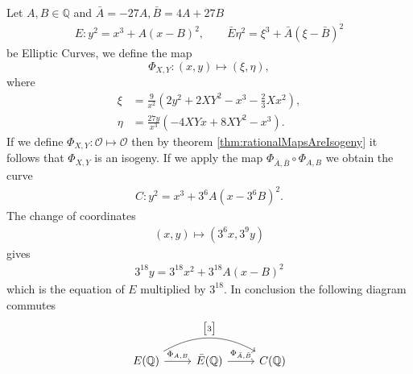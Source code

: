 \begin{example} \label{eq:dualIsogenies}
  Let $A, B \in \mathbb{Q}$ and $\bar{A} = -27A, \bar{B} = 4A + 27B$
  \begin{align*}
    E: y^2 = x^3 + A(x - B)^2, \qquad \bar{E} \eta^2 = \xi^3 + \bar{A} (\xi - \bar{B})^2
  \end{align*}
  be Elliptic Curves, we define the map
  \[ \Phi_{X, Y}: (x, y) \mapsto (\xi, \eta), \]
  where
  \begin{align*}
    \xi &=  \frac{9}{x^2} \left( 2y^2 + 2XY^2 - x^3 - \frac{2}{3} X x^2  \right), \\
    \eta &= \frac{27y}{x^3} \left( -4XYx + 8XY^2 - x^3 \right).
  \end{align*}
  If we define $\Phi_{X, Y}: \mathcal{O} \mapsto \mathcal{O}$ then by
  theorem \ref{thm:rationalMapsAreIsogeny} it follows
  that $\Phi_{X, Y}$ is an isogeny.
  If we apply the map $\Phi_{\bar{A}, \bar{B}} \circ \Phi_{A, B}$
  we obtain the curve
  \begin{align*}
    C: y^2 = x^3 + 3^{6}A(x - 3^6 B)^2.
  \end{align*}
  The change of coordinates
  \begin{align*}
    (x, y) \mapsto (3^6 x, 3^9 y)
  \end{align*}
  gives
  \begin{align*}
    3^{18}y = 3^{18}x^2 + 3^{18}A(x - B)^2
  \end{align*}
  which is the equation of $E$ multiplied by $3^{18}$.
  In conclusion the following diagram commutes
  \begin{equation*}
  \begin{tikzcd}
    E(\mathbb{Q}) \ar[rr, bend left, "\begin{bmatrix}3\end{bmatrix}"] \ar[r, "\Phi_{A, B}"] & \bar{E}(\mathbb{Q}) \ar[r, "\Phi_{\bar{A}, \bar{B}}"] & C(\mathbb{Q})
  \end{tikzcd}
  \end{equation*}

\end{example}
